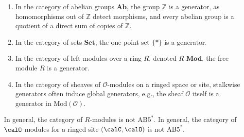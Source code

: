 \begin{example}
\begin{enumerate}
  \item In the category of abelian groups \(\mathbf{Ab}\), the group \(\mathbb{Z}\) is a generator, as homomorphisms out of \(\mathbb{Z}\) detect morphisms, and every abelian group is a quotient of a direct sum of copies of \(\mathbb{Z}\).

  \item In the category of sets \(\mathbf{Set}\), the one-point set \(\{*\}\) is a generator.

  \item In the category of left modules over a ring \(R\), denoted \(R\text{-}\mathbf{Mod}\), the free module \(R\) is a generator.

  \item In the category of sheaves of \(\mathcal{O}\)-modules on a ringed space or site, stalkwise generators often induce global generators, e.g., the sheaf \(\mathcal{O}\) itself is a generator in \(\mathrm{Mod}(\mathcal{O})\).

\end{enumerate}
\end{example}




















\begin{remark}
    In general, the category of $R$-modules is not {AB$5^*$}. In general, the category of $\calO$-modules for a ringed site $(\calC, \calO)$ is not AB$5^*$.
\end{remark}

